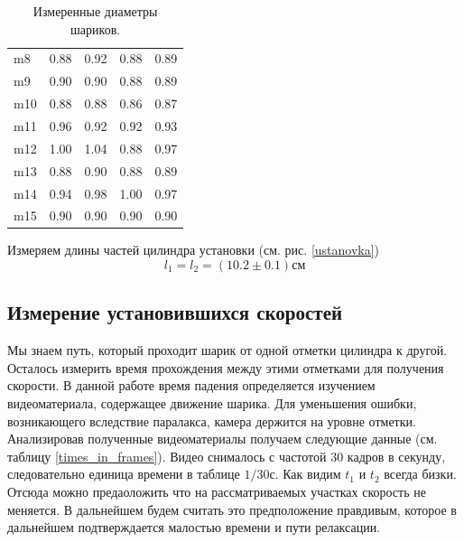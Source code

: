 \documentclass[a4paper, 12pt]{article}
\begin{document}
\begin{table}[h!]
\begin{center}
{\begin{tabular}{|l|rrr|r|}
            m8   &  0.88 &  0.92 &  0.88 &    0.89 \\
            m9   &  0.90 &  0.90 &  0.88 &    0.89 \\
            m10  &  0.88 &  0.88 &  0.86 &    0.87 \\
            m11  &  0.96 &  0.92 &  0.92 &    0.93 \\
            m12  &  1.00 &  1.04 &  0.88 &    0.97 \\
            m13  &  0.88 &  0.90 &  0.88 &    0.89 \\
            m14  &  0.94 &  0.98 &  1.00 &    0.97 \\
            m15  &  0.90 &  0.90 &  0.90 &    0.90 \\
                \hline
            \end{tabular}
        }

        \caption{Измеренные диаметры шариков.}
        \label{diams}
        \end{center}
    \end{table}

    Измеряем длины частей цилиндра установки (см. рис. \ref{ustanovka})
    \begin{equation*}
        l_1=l_2=(10.2\pm0.1)см
    \end{equation*}

    \subsection{Измерение установившихся скоростей}
    Мы знаем путь, который проходит шарик от одной отметки цилиндра к другой. Осталось измерить время прохождения между этими отметками для получения скорости. В данной работе время падения определяется изучением видеоматериала, содержащее движение шарика. Для уменьшения ошибки, возникающего вследствие паралакса, камера держится на уровне отметки. Анализировав полученные видеоматериалы получаем следующие данные (см. таблицу \ref{times_in_frames}). Видео снималось с частотой 30 кадров в секунду, следовательно единица времени в таблице $1/30 с$. Как видим $t_1$ и $t_2$ всегда бизки. Отсюда можно предаоложить что на рассматриваемых участках скорость не меняется. В дальнейшем будем считать это предположение правдивым, которое в дальнейшем подтверждается малостью времени и пути релаксации.
\end{document}
